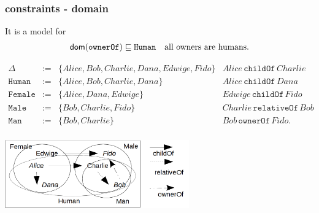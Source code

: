 \documentclass[8pt]{beamer}
\newcommand{\Human}{\mathtt{Human}}
\newcommand{\Male}{\mathtt{Male}}
\newcommand{\Female}{\mathtt{Female}}
\newcommand{\Man}{\mathtt{Man}}
\newcommand{\relative}{\mathtt{relativeOf}}
\newcommand{\child}{\mathtt{childOf}}
\newcommand{\owner}{\mathtt{ownerOf}}
\newcommand{\Alice}{Alice}
\newcommand{\Bob}{Bob}
\newcommand{\Charlie}{Charlie}
\newcommand{\Dana}{Dana}
\newcommand{\Edwige}{Edwige}
\newcommand{\Fido}{Fido}
\begin{document}
\begin{frame}
 \frametitle{\elplusplus constraints - domain}
 It is a model for 
 \[
 \begin{array}{cr}
    \dom(\owner) \Issub \Human & \mbox{all owners are humans.}
 \end{array}
 \]
 
 \[
 \begin{array}{rcl|l}
  \Delta & := & \{ \Alice, \Bob, \Charlie, \Dana, \Edwige, \Fido \} & \Alice\,\child\,\Charlie \\
  \Human & := & \{ \Alice, \Bob, \Charlie, \Dana \} & \Alice\,\child\,\Dana\\
  \Female & := & \{ \Alice, \Dana, \Edwige \} & \Edwige\,\child\,\Fido\\
  \Male & := & \{ \Bob, \Charlie, \Fido \} & \Charlie\,\relative\,\Bob \\
  \Man & := & \{ \Bob, \Charlie \} & \Bob\,\owner\,\Fido . \\
 \end{array}
\]

 \begin{center}
  \includegraphics[width=300px, keepaspectratio]{images/exbaseman_big.png}  
 \end{center}
\end{frame}
\end{document}
